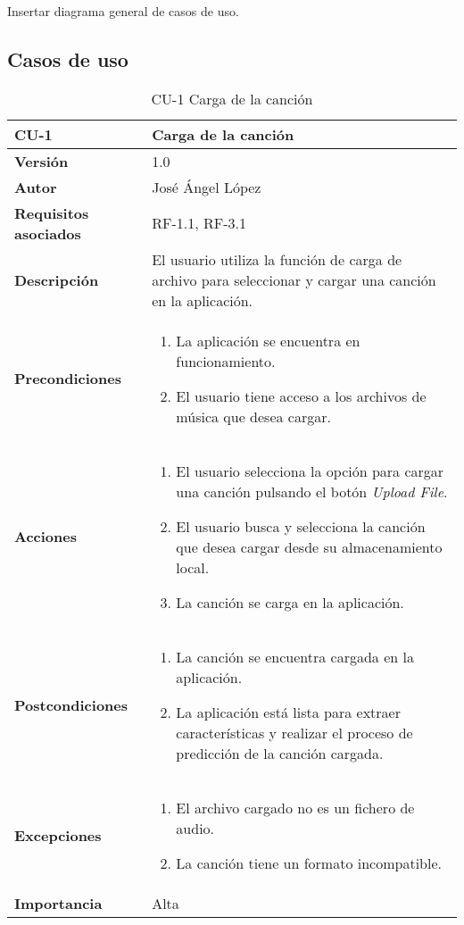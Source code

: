 Insertar diagrama general de casos de uso.

\subsection{Casos de uso}

\begin{table}[p]
	\centering
	\begin{tabularx}{\linewidth}{ p{} p{} }
		\toprule
		\textbf{CU-1}    & \textbf{Carga de la canción}\\
		\toprule
		\textbf{Versión}              & 1.0    \\
		\textbf{Autor}                & José Ángel López \\
		\textbf{Requisitos asociados} & RF-1.1, RF-3.1 \\
		\textbf{Descripción}          & El usuario utiliza la función de carga de archivo para seleccionar y cargar una canción en la aplicación. \\
		\textbf{Precondiciones}        & 
		\begin{enumerate}		    
			\def\labelenumi{\arabic{enumi}.}
			\tightlist
			\item La aplicación se encuentra en funcionamiento.
			\item El usuario tiene acceso a los archivos de música que desea cargar.
		\end{enumerate}\\
		\textbf{Acciones}             &
		\begin{enumerate}
			\def\labelenumi{\arabic{enumi}.}
			\tightlist
			\item El usuario selecciona la opción para cargar una canción pulsando el botón \textit{Upload File}.
			\item El usuario busca y selecciona la canción que desea cargar desde su almacenamiento local.
			\item La canción se carga en la aplicación.
		\end{enumerate}\\
		\textbf{Postcondiciones} &
		\begin{enumerate}
			\def\labelenumi{\arabic{enumi}.}
			\tightlist
			\item La canción se encuentra cargada en la aplicación.
			\item La aplicación está lista para extraer características y realizar el proceso de predicción de la canción cargada.
		\end{enumerate}\\
		\textbf{Excepciones} &
		\begin{enumerate}
			\def\labelenumi{\arabic{enumi}.}
			\tightlist
			\item El archivo cargado no es un fichero de audio.
			\item La canción tiene un formato incompatible.
		\end{enumerate}\\
		\textbf{Importancia}          & Alta \\
		\bottomrule
	\end{tabularx}
	\caption{CU-1 Carga de la canción}
\end{table}

